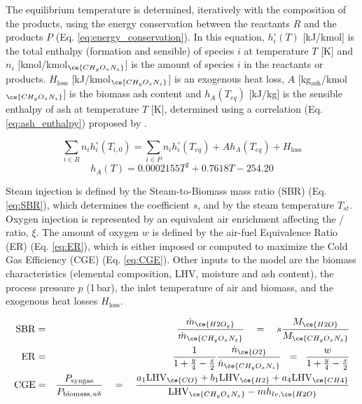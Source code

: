 The equilibrium temperature is determined, iteratively with the composition of the products, using the energy conservation between the reactants $R$ and the products $P$ (Eq. \ref{eq:energy_conservation}). In this equation, $h^{\circ}_i(T)$ [kJ/kmol] is the total enthalpy (formation and sensible) of species $i$ at temperature $T$ [K] and $n_i$ [kmol/kmol$_{\ce{CH_yO_xN_z}}$] is the amount of species $i$ in the reactants or products. $H_\text{loss}$ [kJ/kmol$_{\ce{CH_yO_xN_z}}$] is an exogenous heat loss, $A$ [kg$_\text{ash}$/kmol$_{\ce{CH_yO_xN_z}}$] is the biomass ash content and $h_A(T_{eq})$ [kJ/kg] is the sensible enthalpy of ash at temperature $T$ [K], determined using a correlation (Eq. \ref{eq:ash_enthalpy}) proposed by \citet{Song2013}.

\begin{equation}
\label{eq:energy_conservation} \sum_{i\in R} n_i h_{i}^{\circ}(T_{i,0}) = \sum_{i\in P} n_i h_{i}^{\circ}(T_{eq}) + A h_A(T_{eq}) + H_\text{loss}
\end{equation}
\begin{equation}
\label{eq:ash_enthalpy} h_A(T) = 0.0002155  T^2 + 0.7618 T - 254.20
\end{equation}

Steam injection is defined by the Steam-to-Biomass mass ratio (SBR) (Eq. \ref{eq:SBR}), which determines the coefficient $s$, and by the steam temperature $T_{st}$. Oxygen injection is represented by an equivalent air enrichment affecting the / ratio, $\xi$. The amount of oxygen $w$ is defined by the air-fuel Equivalence Ratio (ER) (Eq. \ref{eq:ER}), which is either imposed or computed to maximize the Cold Gas Efficiency (CGE) (Eq. \ref{eq:CGE}). Other inputs to the model are the biomass characteristics (elemental composition, $\mathrm{LHV}$, moisture and ash content), the process pressure $p$ (1\,bar), the inlet temperature of air and biomass, and the exogenous heat losses $H_\text{loss}$.

\begin{eqnarray}
\label{eq:SBR}\mathrm{SBR}&=&\frac{\dot m_{\ce{H2O_g}}}{\dot m_{\ce{CH_yO_xN_z}}}\quad = \quad s\frac{M_{\ce{H2O}}}{M_{\ce{CH_yO_xN_z}}}\\
\label{eq:ER}\mathrm{ER}&=&\frac{1}{1 + \frac y4 - \frac x2}\frac{\dot n_{\ce{O2}}}{\dot n_{\ce{CH_yO_xN_z}}}\;\; =\;\;\frac{w}{1 + \frac y4 - \frac x2}\\
\label{eq:CGE} \mathrm{CGE}&=&\frac{P_\text{syngas}}{P_\text{biomass,\textit{wb}}}\quad = \quad\frac{a_1\mathrm{LHV}_{\ce{CO}} + b_1\mathrm{LHV}_{\ce{H2}} + a_4\mathrm{LHV}_{\ce{CH4}}}
{\mathrm{LHV}_{\ce{CH_yO_xN_z}}-mh_{lv,\ce{H2O}}}
\end{eqnarray}

